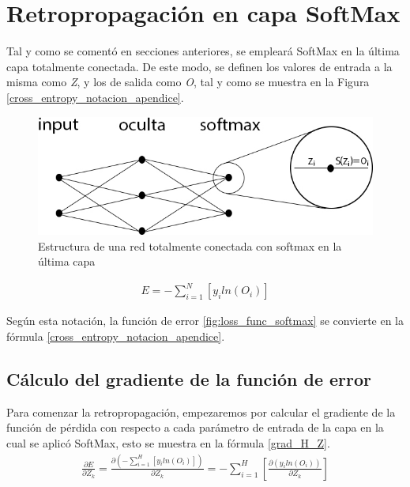 
\chapter{Retropropagación en capa SoftMax} \label{softmax_apendice}


Tal y como se comentó en secciones anteriores, se empleará SoftMax en la última capa totalmente conectada. De este modo, se definen los valores de entrada a la misma como \textit{Z}, y los de salida como \textit{O}, tal y como se muestra en la Figura \ref{cross_entropy_notacion_apendice}.

\begin{figure}[H]
	\centering
	\includegraphics[scale=0.4]{imagenes/NN_softmax.jpg}  
	\caption{Estructura de una red totalmente conectada con softmax en la última capa}
\end{figure}

\begin{gather}
	E = - \sum_{i=1}^{N}  [y_i   ln(O_i)] 
	\label{cross_entropy_notacion_apendice}
\end{gather}

Según esta notación, la función de error \ref{fig:loss_func_softmax} se convierte en la fórmula \ref{cross_entropy_notacion_apendice}.

\section{Cálculo del gradiente de la función de error}

Para comenzar la retropropagación, empezaremos por calcular el gradiente de la función de pérdida con respecto a cada parámetro de entrada de la capa en la cual se aplicó SoftMax, esto se muestra en la fórmula \ref{grad_H_Z}.
\begin{gather}
	\frac{\partial E}{\partial Z_k} = \frac{\partial(- \sum_{i=1}^{H}  [y_i   ln(O_i)])}{\partial Z_k} = - \sum_{i=1}^{H}  [\frac{\partial(y_i   ln(O_i))}{\partial Z_k}] 
	\label{grad_H_Z}
\end{gather}

